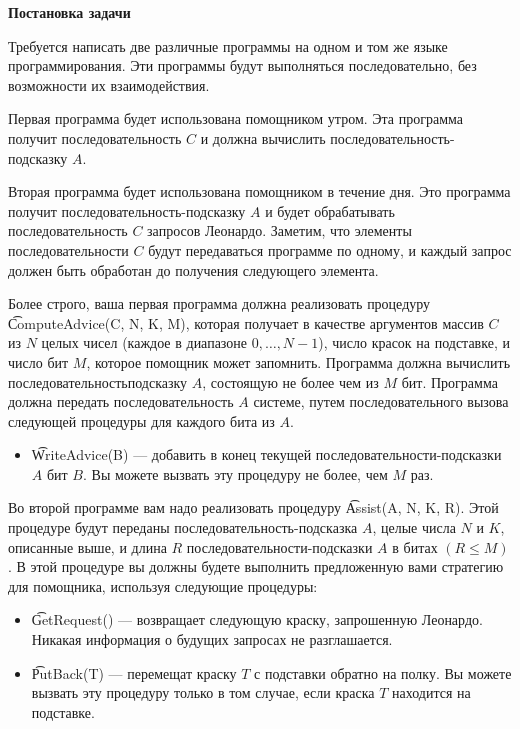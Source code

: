 \bf{Постановка задачи}

Требуется написать две различные программы на одном и том же языке программирования. Эти программы будут выполняться последовательно, без возможности их взаимодействия.

Первая программа будет использована помощником утром. Эта программа получит последовательность $C$ и должна вычислить последовательность-подсказку $A$.

Вторая программа будет использована помощником в течение дня. Это программа получит последовательность-подсказку $A$ и будет обрабатывать последовательность $C$ запросов Леонардо. Заметим, что элементы последовательности $C$ будут передаваться программе по одному, и каждый запрос должен быть обработан до получения следующего элемента.

Более строго, ваша первая программа должна реализовать процедуру \t{ComputeAdvice(C, N, K, M)}, которая получает в качестве аргументов массив $C$ из $N$ целых чисел (каждое в диапазоне $0, \dots, N-1$), число красок на подставке, и число бит $M$, которое помощник может запомнить. Программа должна вычислить последовательностьподсказку $A$, состоящую не более чем из $M$ бит. Программа должна передать последовательность $A$ системе, путем последовательного вызова следующей процедуры для каждого бита из $A$. 

\begin{itemize}

\item \t{WriteAdvice(B)} --- добавить в конец текущей последовательности-подсказки $A$ бит $B$. Вы можете вызвать эту процедуру не более, чем $M$ раз.

\end{itemize}

Во второй программе вам надо реализовать процедуру \t{Assist(A, N, K, R)}. Этой процедуре будут переданы последовательность-подсказка $A$, целые числа $N$ и $K$, описанные выше, и длина $R$ последовательности-подсказки $A$ в битах $(R \le M)$. В этой процедуре вы должны будете выполнить предложенную вами стратегию для помощника, используя следующие процедуры:

\begin{itemize}

\item \t{GetRequest()} --- возвращает следующую краску, запрошенную Леонардо. Никакая информация о будущих запросах не разглашается.

\item \t{PutBack(T)} --- перемещат краску $T$ с подставки обратно на полку. Вы можете вызвать эту процедуру только в том случае, если краска $T$ находится на подставке.

\end{itemize}

